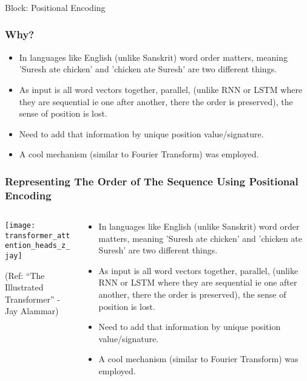 \begin{frame}[fragile]\frametitle{}
\begin{center}
{\Large Block: Positional Encoding}
\end{center}
\end{frame}

\begin{frame}[fragile]\frametitle{Why?}


\begin{itemize}
\item In languages like English (unlike Sanskrit) word order matters, meaning 'Suresh ate chicken' and 'chicken ate Suresh' are two different things.
\item As input is all word vectors together, parallel, (unlike RNN or LSTM where they are sequential ie one after another, there the order is preserved), the sense of position is lost.
\item Need to add that information by unique position value/signature.
\item A cool mechanism (similar to Fourier Transform) was employed.
\end{itemize}

\end{frame}

\begin{frame}[fragile]\frametitle{Representing The Order of The Sequence Using Positional Encoding}


\begin{columns}
    \begin{column}[T]{0.5\linewidth}
\begin{center}
\texttt{[image: transformer\_attention\_heads\_z\_jay]}


{\tiny (Ref: ``The Illustrated Transformer'' - Jay Alammar)}
\end{center}		

		\end{column}
    \begin{column}[T]{0.5\linewidth}

\begin{itemize}
\item In languages like English (unlike Sanskrit) word order matters, meaning 'Suresh ate chicken' and 'chicken ate Suresh' are two different things.
\item As input is all word vectors together, parallel, (unlike RNN or LSTM where they are sequential ie one after another, there the order is preserved), the sense of position is lost.
\item Need to add that information by unique position value/signature.
\item A cool mechanism (similar to Fourier Transform) was employed.
\end{itemize}
    \end{column}
  \end{columns}
\end{frame}

